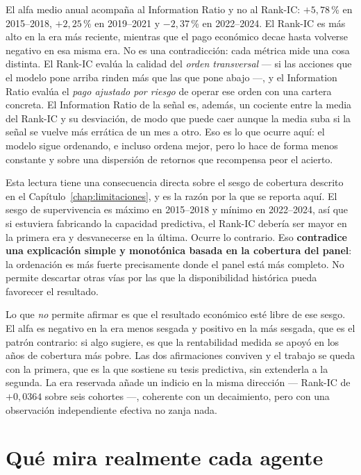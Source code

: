 El alfa medio anual acompaña al Information Ratio y no al Rank-IC: $+5{,}78$\,\% en 2015--2018,
$+2{,}25$\,\% en 2019--2021 y $-2{,}37$\,\% en 2022--2024. El Rank-IC es más alto en la era más
reciente, mientras que el pago económico decae hasta volverse
negativo en esa misma era. No es una contradicción: cada métrica mide una cosa distinta. El Rank-IC
evalúa la calidad del \emph{orden transversal} --- si las acciones que el modelo pone arriba rinden
más que las que pone abajo ---, y el Information Ratio evalúa el \emph{pago ajustado por riesgo} de
operar ese orden con una cartera concreta. El Information Ratio de la señal es, además, un cociente
entre la media del Rank-IC y su desviación, de modo que puede caer aunque la media suba si la señal
se vuelve más errática de un mes a otro. Eso es lo que ocurre aquí: el modelo sigue ordenando, e
incluso ordena mejor, pero lo hace de forma menos constante y sobre una dispersión de retornos que
recompensa peor el acierto.

Esta lectura tiene una consecuencia directa sobre el sesgo de cobertura descrito en el
Capítulo~\ref{chap:limitaciones}, y es la razón por la que se reporta aquí. El sesgo de
supervivencia es máximo en 2015--2018 y mínimo en 2022--2024, así que si estuviera fabricando la
capacidad predictiva, el Rank-IC debería ser mayor en la primera era y desvanecerse en la última.
Ocurre lo contrario. Eso \textbf{contradice una explicación simple y monotónica basada en la
cobertura del panel}: la ordenación es más fuerte precisamente donde el panel está más completo.
No permite descartar otras vías por las que la disponibilidad histórica pueda favorecer el
resultado.

Lo que \emph{no} permite afirmar es que el resultado económico esté libre de ese sesgo. El alfa es
negativo en la era menos sesgada y positivo en la más sesgada, que es el patrón contrario: si algo
sugiere, es que la rentabilidad medida se apoyó en los años de cobertura más pobre. Las dos
afirmaciones conviven y el trabajo se queda con la primera, que es la que sostiene su tesis
predictiva, sin extenderla a la segunda. La era reservada añade un indicio en la misma dirección
--- Rank-IC de $+0{,}0364$ sobre seis cohortes ---, coherente con un decaimiento, pero con una
observación independiente efectiva no zanja nada.

\section{Qué mira realmente cada agente}
\label{sec:atribucion-local}

